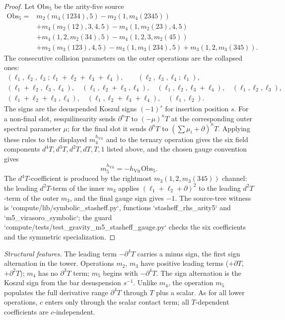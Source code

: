 \begin{proof}
Let \(\mathrm{Obs}_5\) be the arity-five source
\[
\begin{aligned}
\mathrm{Obs}_5={}&
m_2(m_4(1234),5)-m_2(1,m_4(2345))
\\
&+m_4(m_2(12),3,4,5)-m_4(1,m_2(23),4,5)
\\
&+m_4(1,2,m_2(34),5)-m_4(1,2,3,m_2(45))
\\
&+m_3(m_3(123),4,5)-m_3(1,m_3(234),5)
+m_3(1,2,m_3(345)).
\end{aligned}
\]
The consecutive collision parameters on the outer operations are the
collapsed ones:
\[
\begin{gathered}
(\ell_1,\ell_2,\ell_3;\ell_1+\ell_2+\ell_3+\ell_4),
\qquad
(\ell_2,\ell_3,\ell_4;\ell_1),                                      \\
(\ell_1+\ell_2,\ell_3,\ell_4),\quad
(\ell_1,\ell_2+\ell_3,\ell_4),\quad
(\ell_1,\ell_2,\ell_3+\ell_4),\quad
(\ell_1,\ell_2,\ell_3),                                             \\
(\ell_1+\ell_2+\ell_3,\ell_4),\quad
(\ell_1,\ell_2+\ell_3+\ell_4),\quad
(\ell_1,\ell_2).
\end{gathered}
\]
The signs are the desuspended Koszul signs \((-1)^s\) for insertion
position \(s\).  For a non-final slot, sesquilinearity sends
\(\partial^nT\) to \((-\mu)^nT\) at the corresponding outer spectral
parameter \(\mu\); for the final slot it sends \(\partial^nT\) to
\((\sum\mu_i+\partial)^nT\).  Applying these rules to the displayed
\(m_4^{h_{\mathrm{Vir}}}\) and to the ternary operation gives the
six field components \(d^4T,d^3T,d^2T,dT,T,1\) listed above, and the
chosen gauge convention gives
\[
m_5^{h_{\mathrm{Vir}}}=-h_{\mathrm{Vir}}\mathrm{Obs}_5 .
\]
The \(d^4T\)-coefficient is produced by the rightmost
\(m_3(1,2,m_3(345))\) channel: the leading \(d^2T\)-term of the inner
\(m_3\) applies \((\ell_1+\ell_2+\partial)^2\) to the leading
\(d^2T\)-term of the outer \(m_3\), and the final gauge sign gives
\(-1\).  The source-tree witness is
`compute/lib/symbolic_stasheff.py`, functions `stasheff_rhs_arity5`
and `m5_virasoro_symbolic`; the guard
`compute/tests/test_gravity_m5_stasheff_gauge.py` checks the six
coefficients and the symmetric specialization.
\end{proof}

\noindent
\textit{Structural features.}
The leading term $-\partial^4 T$ carries a minus sign, the first
sign alternation in the tower.
Operations $m_2$, $m_3$ have positive leading terms ($+\partial T$,
$+\partial^2 T$); $m_4$ has no $\partial^3 T$ term; $m_5$ begins
with $-\partial^4 T$.
The sign alternation is the Koszul sign from the bar desuspension
$s^{-1}$.
Unlike $m_4$, the operation $m_5$ populates the full derivative range
$\partial^4 T$ through $T$ plus a scalar.
As for all lower operations, $c$ enters only through the scalar
contact term; all $T$-dependent coefficients are $c$-independent.


